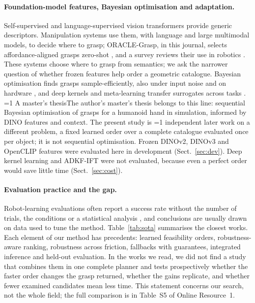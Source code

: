 \documentclass[pdflatex,sn-mathphys-num,iicol]{sn-jnl}
\providecommand{\anonymous}{0}
\newcommand{\anon}[2]{\ifnum\anonymous=1 #1\else #2\fi}
\begin{document}
\paragraph{Foundation-model features, Bayesian optimisation and adaptation.} Self-supervised and language-supervised vision transformers \cite{caron2021dino,oquab2024dinov2,simeoni2025dinov3,radford2021clip,cherti2023openclip} provide generic descriptors. Manipulation systems use them, with language and large multimodal models, to decide where to grasp; ORACLE-Grasp, in this journal, selects affordance-aligned grasps zero-shot \cite{giuili2026oracle}, and a survey reviews their use in robotics \cite{firoozi2025foundation}. These systems choose where to grasp from semantics; we ask the narrower question of whether frozen features help order a geometric catalogue. Bayesian optimisation finds grasps sample-efficiently, also under input noise and on hardware \cite{nogueira2016unscented,lechuzsierra2024bo}, and deep kernels and meta-learning transfer surrogates across tasks \cite{wilson2016dkl,chen2023adkfift}. \anon{A master's thesis}{The author's master's thesis} \cite{perezgonzalez2025tfm} belongs to this line: sequential Bayesian optimisation of grasps for a humanoid hand in simulation, informed by DINO features and context. The present study is \anon{}{independent later work on }a different problem, a fixed learned order over a complete catalogue evaluated once per object; it is not sequential optimisation. Frozen DINOv2, DINOv3 and OpenCLIP features were evaluated here in development (Sect.~\ref{sec:dev}). Deep kernel learning and ADKF-IFT were not evaluated, because even a perfect order would save little time (Sect.~\ref{sec:cost}).

\paragraph{Evaluation practice and the gap.} Robot-learning evaluations often report a success rate without the number of trials, the conditions or a statistical analysis \cite{kressgazit2024empirical}, and conclusions are usually drawn on data used to tune the method. Table~\ref{tab:sota} summarises the closest works. Each element of our method has precedents: learned feasibility orders, robustness-aware ranking, robustness across friction, fallbacks with guarantees, integrated inference and held-out evaluation. In the works we read, we did not find a study that combines them in one complete planner and tests prospectively whether the faster order changes the grasp returned, whether the gains replicate, and whether fewer examined candidates mean less time. This statement concerns our search, not the whole field; the full comparison is in Table~S5 of Online Resource~1.
\end{document}
